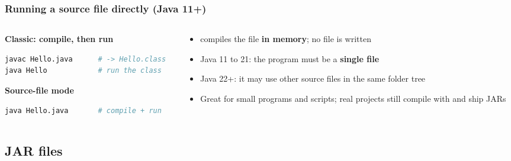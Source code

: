 \documentclass[aspectratio=169,10pt,compress]{beamer}
\begin{document}
\begin{frame}[t,fragile] \frametitle{Running a source file directly (Java 11+)}
  \begin{columns}[T]
    \begin{column}{0.5\textwidth}
      \textbf{Classic: compile, then run}


\begin{lstlisting}[style=codesnippet, language=bash]
javac Hello.java      # -> Hello.class
java Hello            # run the class
\end{lstlisting}


      \textbf{Source-file mode}


\begin{lstlisting}[style=codesnippet, language=bash]
java Hello.java       # compile + run
\end{lstlisting}


    \end{column}
    \begin{column}{0.46\textwidth}
      \begin{itemize}\small
        \item {} compiles the file \textbf{in memory}; no  file is written
        \item Java 11 to 21: the program must be a \textbf{single file}
        \item Java 22+: it may use other source files in the same folder tree
        \item Great for small programs and scripts; real projects still compile with  and ship JARs
      \end{itemize}
    \end{column}
  \end{columns}
\end{frame}


\subsection[JAR]{JAR files}
\end{document}
